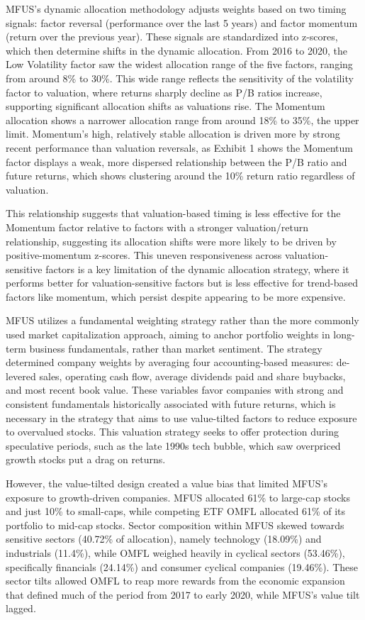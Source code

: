 \documentclass[
  letterpaper,
  DIV=11,
  numbers=noendperiod]{scrartcl}
\begin{document}
MFUS's dynamic allocation methodology adjusts weights based on two
timing signals: factor reversal (performance over the last 5 years) and
factor momentum (return over the previous year). These signals are
standardized into z-scores, which then determine shifts in the dynamic
allocation. From 2016 to 2020, the Low Volatility factor saw the widest
allocation range of the five factors, ranging from around 8\% to 30\%.
This wide range reflects the sensitivity of the volatility factor to
valuation, where returns sharply decline as P/B ratios increase,
supporting significant allocation shifts as valuations rise. The
Momentum allocation shows a narrower allocation range from around 18\%
to 35\%, the upper limit. Momentum's high, relatively stable allocation
is driven more by strong recent performance than valuation reversals, as
Exhibit 1 shows the Momentum factor displays a weak, more dispersed
relationship between the P/B ratio and future returns, which shows
clustering around the 10\% return ratio regardless of valuation.

This relationship suggests that valuation-based timing is less effective
for the Momentum factor relative to factors with a stronger
valuation/return relationship, suggesting its allocation shifts were
more likely to be driven by positive-momentum z-scores. This uneven
responsiveness across valuation-sensitive factors is a key limitation of
the dynamic allocation strategy, where it performs better for
valuation-sensitive factors but is less effective for trend-based
factors like momentum, which persist despite appearing to be more
expensive.

MFUS utilizes a fundamental weighting strategy rather than the more
commonly used market capitalization approach, aiming to anchor portfolio
weights in long-term business fundamentals, rather than market
sentiment. The strategy determined company weights by averaging four
accounting-based measures: de-levered sales, operating cash flow,
average dividends paid and share buybacks, and most recent book value.
These variables favor companies with strong and consistent fundamentals
historically associated with future returns, which is necessary in the
strategy that aims to use value-tilted factors to reduce exposure to
overvalued stocks. This valuation strategy seeks to offer protection
during speculative periods, such as the late 1990s tech bubble, which
saw overpriced growth stocks put a drag on returns.

However, the value-tilted design created a value bias that limited
MFUS's exposure to growth-driven companies. MFUS allocated 61\% to
large-cap stocks and just 10\% to small-caps, while competing ETF OMFL
allocated 61\% of its portfolio to mid-cap stocks. Sector composition
within MFUS skewed towards sensitive sectors (40.72\% of allocation),
namely technology (18.09\%) and industrials (11.4\%), while OMFL weighed
heavily in cyclical sectors (53.46\%), specifically financials (24.14\%)
and consumer cyclical companies (19.46\%). These sector tilts allowed
OMFL to reap more rewards from the economic expansion that defined much
of the period from 2017 to early 2020, while MFUS's value tilt lagged.
\end{document}

